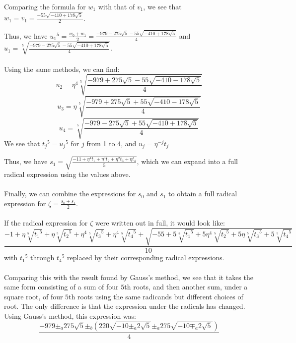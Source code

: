 \documentclass{article}
\begin{document}
\begin{adjustwidth}{1cm}{}
\begin{adjustwidth}{1cm}{}
\begin{adjustwidth}{1cm}{}
                    Comparing the formula for $ w_1 $ with that of $ v_1 $, we see that $ w_1 = v_1 = \frac{-55 \sqrt{-410+178 \sqrt{5}}}{2} $.\\
                \end{adjustwidth}
            \end{adjustwidth}
            Thus, we have $ {u_1}^5 = \frac{w_0 + w_1}{2} = \frac{-979-275 \sqrt{5}-55 \sqrt{-410+178 \sqrt{5}}}{4} $ and $ u_1 = \sqrt[5]{\frac{-979-275 \sqrt{5}-55 \sqrt{-410+178 \sqrt{5}}}{4}} $.\\
            \\
            Using the same methods, we can find:
            $$ u_2 = \eta^4 \sqrt[5]{\frac{-979+275 \sqrt{5}-55 \sqrt{-410-178 \sqrt{5}}}{4}} $$
            $$ u_3 = \eta \sqrt[5]{\frac{-979+275 \sqrt{5}+55 \sqrt{-410-178 \sqrt{5}}}{4}} $$
            $$ u_4 = \sqrt[5]{\frac{-979-275 \sqrt{5}+55 \sqrt{-410+178 \sqrt{5}}}{4}} $$
            We see that $ {t_j}^5 = {u_j}^5 $ for $ j $ from 1 to 4, and $ u_j = \eta^{-j} t_j $\\
        \end{adjustwidth}
        Thus, we have $ s_1 = \sqrt{\frac{-11 + \eta^4 t_1 + \eta^3 t_2 + \eta^2 t_3 + \eta t_4}{5}} $, which we can expand into a full radical expression using the values above.\\
        \\
        Finally, we can combine the expressions for $ s_0 $ and $ s_1 $ to obtain a full radical expression for $ \zeta = \frac{s_0 + s_1}{2} $.\\
        \\
        If the radical expression for $ \zeta $ were written out in full, it would look like:
        $$ \frac{-1 + \eta \sqrt[5]{{t_1}^5} + \eta \sqrt[5]{{t_2}^5} + \eta^4 \sqrt[5]{{t_3}^5} + \eta^4 \sqrt[5]{{t_4}^5} + \sqrt{-55 + 5\sqrt[5]{{t_1}^5} + 5\eta^4 \sqrt[5]{{t_2}^5} + 5\eta \sqrt[5]{{t_3}^5} + 5\sqrt[5]{{t_4}^5}}}{10} $$
        with $ {t_1}^5 $ through $ {t_4}^5 $ replaced by their corresponding radical expressions.\\
        \\
        Comparing this with the result found by Gauss's method, we see that it takes the same form consisting of a sum of four $ 5 $th roots, and then another sum, under a square root, of four $ 5 $th roots using the same radicands but different choices of root. The only difference is that the expression under the radicals has changed. Using Gauss's method, this expression was:
        $$ \frac{-979 \pm_a 275 \sqrt{5} \pm_b (220 \sqrt{-10 \pm_a 2 \sqrt{5}} \pm_a 275 \sqrt{-10 \mp_a 2 \sqrt{5}})}{4} $$
\end{document}
